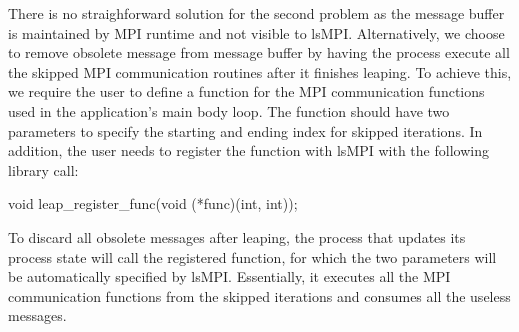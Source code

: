 There is no straighforward solution for the second problem as the message buffer is maintained by MPI runtime and not visible to lsMPI. Alternatively, we choose to remove obsolete message from message buffer by having the process execute all the skipped MPI communication routines after it finishes leaping. To achieve this, we require the user to define a function for the MPI communication functions used in the application's main body loop. The function should have two parameters to specify the starting and ending index for skipped iterations. In addition, the user needs to register the function with lsMPI with the following library call:

void leap\_register\_func(void (*func)(int, int));

To discard all obsolete messages after leaping, the process that updates its process state will call the registered function, for which the two parameters will be automatically specified by lsMPI. Essentially, it executes all the  MPI communication functions from the skipped iterations and consumes all the useless messages.  

